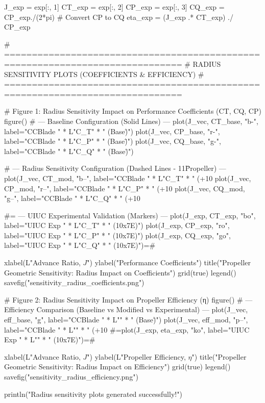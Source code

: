 J_exp  = exp[:, 1]
CT_exp = exp[:, 2]
CP_exp = exp[:, 3]
CQ_exp = CP_exp./(2*pi) # Convert CP to CQ
eta_exp = (J_exp .* CT_exp) ./ CP_exp


# ==============================================================================
# RADIUS SENSITIVITY PLOTS (COEFFICIENTS & EFFICIENCY)
# ==============================================================================

# Figure 1: Radius Sensitivity Impact on Performance Coefficients (CT, CQ, CP)
figure()
# --- Baseline Configuration (Solid Lines) ---
plot(J_vec, CT_base, "b-", label="CCBlade " * L"C_T" * " (Base\")")
plot(J_vec, CP_base, "r-", label="CCBlade " * L"C_P" * " (Base\")")
plot(J_vec, CQ_base, "g-", label="CCBlade " * L"C_Q" * " (Base\")")

# --- Radius Sensitivity Configuration (Dashed Lines - 11\" Propeller) ---
plot(J_vec, CT_mod, "b--", label="CCBlade " * L"C_T" * " (+10%
plot(J_vec, CP_mod, "r--", label="CCBlade " * L"C_P" * " (+10%
plot(J_vec, CQ_mod, "g--", label="CCBlade " * L"C_Q" * " (+10%

#= --- UIUC Experimental Validation (Markers) ---
plot(J_exp, CT_exp, "bo", label="UIUC Exp " * L"C_T" * " (10x7E)")
plot(J_exp, CP_exp, "ro", label="UIUC Exp " * L"C_P" * " (10x7E)")
plot(J_exp, CQ_exp, "go", label="UIUC Exp " * L"C_Q" * " (10x7E)")=#

xlabel(L"Advance Ratio, $J$")
ylabel("Performance Coefficients")
title("Propeller Geometric Sensitivity: Radius Impact on Coefficients")
grid(true)
legend()
savefig("sensitivity_radius_coefficients.png")


# Figure 2: Radius Sensitivity Impact on Propeller Efficiency (η)
figure()
# --- Efficiency Comparison (Baseline vs Modified vs Experimental) ---
plot(J_vec, eff_base, "g", label="CCBlade " * L"\eta" * " (Base\")")
plot(J_vec, eff_mod, "p--", label="CCBlade " * L"\eta" * " (+10%
#=plot(J_exp, eta_exp, "ko", label="UIUC Exp " * L"\eta" * " (10x7E)")=#

xlabel(L"Advance Ratio, $J$")
ylabel(L"Propeller Efficiency, $\eta$")
title("Propeller Geometric Sensitivity: Radius Impact on Efficiency")
grid(true)
legend()
savefig("sensitivity_radius_efficiency.png")

println("Radius sensitivity plots generated successfully!")